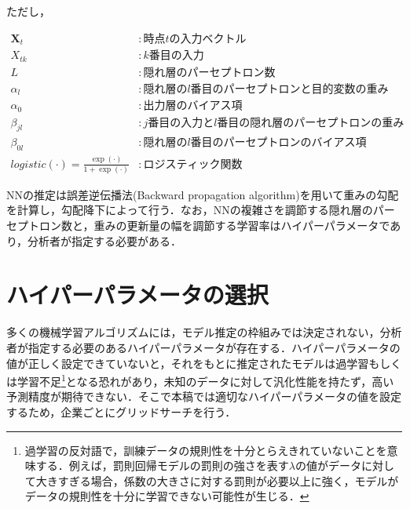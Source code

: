 \documentclass[a4paper，11pt]{jsarticle}
\begin{document}
ただし，

\begin{equation}
  \begin{split}
    \bm{X}_t &: 時点tの入力ベクトル \\
    X_{tk} &: k番目の入力 \\
    L &: 隠れ層のパーセプトロン数 \\
    \alpha_l &: 隠れ層のl番目のパーセプトロンと目的変数の重み \\
    \alpha_0 &: 出力層のバイアス項 \\
    \beta_{jl} &: j番目の入力とl番目の隠れ層のパーセプトロンの重み \\
    \beta_{0l} &: 隠れ層のl番目のパーセプトロンのバイアス項 \\
    \textit{logistic}(\cdot) = \frac{\exp(\cdot)}{1 + \exp(\cdot)} &: ロジスティック関数
  \end{split}
\end{equation}

NNの推定は誤差逆伝播法(Backward propagation algorithm)を用いて重みの勾配を計算し，勾配降下によって行う．なお，NNの複雑さを調節する隠れ層のパーセプトロン数と，重みの更新量の幅を調節する学習率はハイパーパラメータであり，分析者が指定する必要がある．

\section{ハイパーパラメータの選択} \label{sec:hyparam}

多くの機械学習アルゴリズムには，モデル推定の枠組みでは決定されない，分析者が指定する必要のあるハイパーパラメータが存在する．ハイパーパラメータの値が正しく設定できていないと，それをもとに推定されたモデルは過学習もしくは学習不足\footnote{過学習の反対語で，訓練データの規則性を十分とらえきれていないことを意味する．例えば，罰則回帰モデルの罰則の強さを表す$\lambda$の値がデータに対して大きすぎる場合，係数の大きさに対する罰則が必要以上に強く，モデルがデータの規則性を十分に学習できない可能性が生じる．}となる恐れがあり，未知のデータに対して汎化性能を持たず，高い予測精度が期待できない．そこで本稿では適切なハイパーパラメータの値を設定するため，企業ごとにグリッドサーチを行う．
\end{document}
